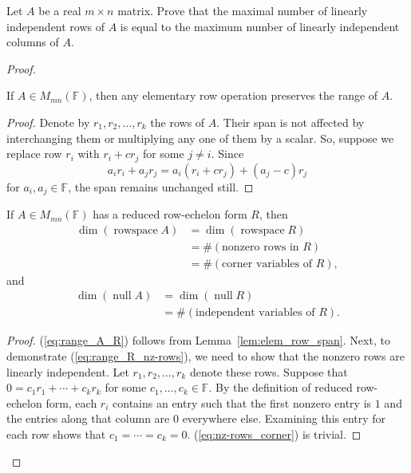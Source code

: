 \documentclass{article}
\begin{document}
\begin{problem}
Let \(A\) be a real \(m\times n\) matrix. Prove that the maximal number of
linearly independent rows of  \(A\) is equal to the maximum number of linearly
independent columns of  \(A\).
\end{problem}
\begin{proof}\leavevmode
	\begin{lemma}\label{lem:elem_row_span}
		If \(A\in M_{mn}(\mathbb{F})\), then any elementary row
		operation preserves the range of \(A\).
	\end{lemma}
	\begin{proof}
		Denote by \(r_1, r_2, \ldots, r_k\) the rows of \(A\).  Their span is not
		affected by interchanging them or multiplying any one of them by a scalar.
		So, suppose we replace row \(r_i\) with \(r_i + c r_j\) for some \(j\neq
		i\).  Since
		\[
			a_i r_i + a_j r_j = a_i (r_i + c r_j) + (a_j - c)r_j
		\]
		for \(a_i, a_j\in \mathbb{F}\), the span remains unchanged still.
	\end{proof}
	\begin{lemma}\label{lem:row-space_null_rref}
		If \(A\in M_{mn}(\mathbb{F})\) has a reduced row-echelon form \(R\), then
		\begin{align}
			\dim (\operatorname{row space} A) & = \dim (\operatorname{row space} R) \label{eq:range_A_R}        \\
			                                  & = \# (\text{nonzero rows in } R) \label{eq:range_R_nz-rows}     \\
			                                  & = \# (\text{corner variables of } R) \label{eq:nz-rows_corner},
		\end{align}
		and
		\begin{align}
			\dim (\operatorname{null} A) & = \dim (\operatorname{null} R) \label{eq:null_A_R}                \\
			                             & = \# (\text{independent variables of } R) \label{eq:null_R_indep}
			.\end{align}
	\end{lemma}
	\begin{proof}
		(\ref{eq:range_A_R}) follows from Lemma~\ref{lem:elem_row_span}.  Next, to
		demonstrate (\ref{eq:range_R_nz-rows}), we need to show that the nonzero
		rows are linearly independent. Let \(r_1, r_2, \ldots, r_k\) denote these
		rows.  Suppose that \(0 = c_1 r_1 + \cdots + c_k r_k\) for some \(c_1,
		\ldots, c_k\in \mathbb{F}\).  By the definition of reduced row-echelon
		form, each \(r_i\) contains an entry such that the first nonzero entry is
		\(1\) and the entries along that column are \(0\) everywhere else.
		Examining this entry for each row shows that \(c_1 = \cdots = c_k = 0\).
		(\ref{eq:nz-rows_corner}) is trivial.


\end{proof}
\end{proof}
\end{document}
